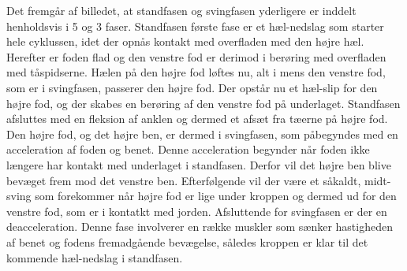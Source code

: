 Det fremgår af billedet, at standfasen og svingfasen yderligere er inddelt henholdsvis i 5 og 3 faser. \newline
Standfasen første fase er et hæl-nedslag som starter hele cyklussen, idet der opnås kontakt med overfladen med den højre hæl. Herefter er foden flad og den venstre fod er derimod i berøring med overfladen med tåspidserne. Hælen på den højre fod løftes nu, alt i mens den venstre fod, som er i svingfasen, passerer den højre fod. Der opstår nu et hæl-slip for den højre fod, og der skabes en berøring af den venstre fod på underlaget. Standfasen afsluttes med en fleksion af anklen og dermed et afsæt fra tæerne på højre fod. \newline
Den højre fod, og det højre ben, er dermed i svingfasen, som påbegyndes med en acceleration af foden og benet. Denne acceleration begynder når foden ikke længere har kontakt med underlaget i standfasen. Derfor vil det højre ben blive bevæget frem mod det venstre ben. Efterfølgende vil der være et såkaldt, midt-sving som forekommer når højre fod er lige under kroppen og dermed ud for den venstre fod, som er i kontatkt med jorden. Afsluttende for svingfasen er der en deacceleration. Denne fase involverer en række muskler som sænker hastigheden af benet og fodens fremadgående bevægelse, således kroppen er klar til det kommende hæl-nedslag i standfasen.






